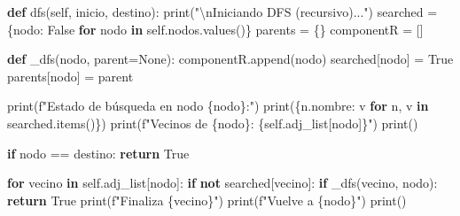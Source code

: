 \documentclass[
  spanish,
  letterpaper,
  DIV=11,
  numbers=noendperiod]{scrartcl}
\newenvironment{Shaded}{\begin{snugshade}}{\end{snugshade}}
\newcommand{\BuiltInTok}[1]{\textcolor[rgb]{0.00,0.23,0.31}{#1}}
\newcommand{\CharTok}[1]{\textcolor[rgb]{0.13,0.47,0.30}{#1}}
\newcommand{\ControlFlowTok}[1]{\textcolor[rgb]{0.00,0.23,0.31}{\textbf{#1}}}
\newcommand{\KeywordTok}[1]{\textcolor[rgb]{0.00,0.23,0.31}{\textbf{#1}}}
\newcommand{\NormalTok}[1]{\textcolor[rgb]{0.00,0.23,0.31}{#1}}
\newcommand{\OperatorTok}[1]{\textcolor[rgb]{0.37,0.37,0.37}{#1}}
\newcommand{\SpecialCharTok}[1]{\textcolor[rgb]{0.37,0.37,0.37}{#1}}
\newcommand{\SpecialStringTok}[1]{\textcolor[rgb]{0.13,0.47,0.30}{#1}}
\newcommand{\StringTok}[1]{\textcolor[rgb]{0.13,0.47,0.30}{#1}}
\newcommand{\VariableTok}[1]{\textcolor[rgb]{0.07,0.07,0.07}{#1}}
\begin{document}
\begin{Shaded}
\begin{Highlighting}[]

\KeywordTok{def}\NormalTok{ dfs(}\VariableTok{self}\NormalTok{, inicio, destino):}
        \BuiltInTok{print}\NormalTok{(}\StringTok{"}\CharTok{\textbackslash{}n}\StringTok{Iniciando DFS (recursivo)..."}\NormalTok{)}
\NormalTok{        searched }\OperatorTok{=}\NormalTok{ \{nodo: }\VariableTok{False} \ControlFlowTok{for}\NormalTok{ nodo }\KeywordTok{in} \VariableTok{self}\NormalTok{.nodos.values()\}}
\NormalTok{        parents }\OperatorTok{=}\NormalTok{ \{\}}
\NormalTok{        componentR }\OperatorTok{=}\NormalTok{ []}

        \KeywordTok{def}\NormalTok{ \_dfs(nodo, parent}\OperatorTok{=}\VariableTok{None}\NormalTok{):}
\NormalTok{            componentR.append(nodo)}
\NormalTok{            searched[nodo] }\OperatorTok{=} \VariableTok{True}
\NormalTok{            parents[nodo] }\OperatorTok{=}\NormalTok{ parent}

            \BuiltInTok{print}\NormalTok{(}\SpecialStringTok{f"Estado de búsqueda en nodo }\SpecialCharTok{\{}\NormalTok{nodo}\SpecialCharTok{\}}\SpecialStringTok{:"}\NormalTok{)}
            \BuiltInTok{print}\NormalTok{(\{n.nombre: v }\ControlFlowTok{for}\NormalTok{ n, v }\KeywordTok{in}\NormalTok{ searched.items()\})}
            \BuiltInTok{print}\NormalTok{(}\SpecialStringTok{f"Vecinos de }\SpecialCharTok{\{}\NormalTok{nodo}\SpecialCharTok{\}}\SpecialStringTok{: }\SpecialCharTok{\{}\VariableTok{self}\SpecialCharTok{.}\NormalTok{adj\_list[nodo]}\SpecialCharTok{\}}\SpecialStringTok{"}\NormalTok{)}
            \BuiltInTok{print}\NormalTok{()}

            \ControlFlowTok{if}\NormalTok{ nodo }\OperatorTok{==}\NormalTok{ destino:}
                \ControlFlowTok{return} \VariableTok{True}

            \ControlFlowTok{for}\NormalTok{ vecino }\KeywordTok{in} \VariableTok{self}\NormalTok{.adj\_list[nodo]:}
                \ControlFlowTok{if} \KeywordTok{not}\NormalTok{ searched[vecino]:}
                    \ControlFlowTok{if}\NormalTok{ \_dfs(vecino, nodo):}
                        \ControlFlowTok{return} \VariableTok{True}
                    \BuiltInTok{print}\NormalTok{(}\SpecialStringTok{f"Finaliza }\SpecialCharTok{\{}\NormalTok{vecino}\SpecialCharTok{\}}\SpecialStringTok{"}\NormalTok{)}
                    \BuiltInTok{print}\NormalTok{(}\SpecialStringTok{f"Vuelve a }\SpecialCharTok{\{}\NormalTok{nodo}\SpecialCharTok{\}}\SpecialStringTok{"}\NormalTok{)}
                    \BuiltInTok{print}\NormalTok{()}


\end{Highlighting}
\end{Shaded}
\end{document}
